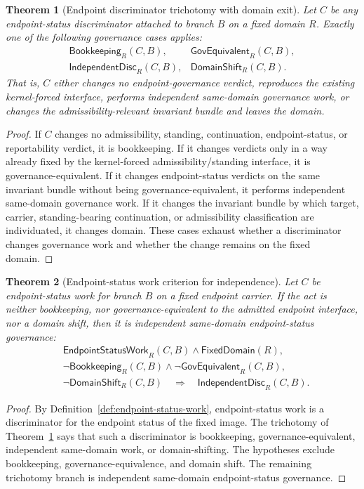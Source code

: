 \documentclass[11pt]{article}
\newtheorem{theorem}{Theorem}[section]
\theoremstyle{definition}
\theoremstyle{remark}
\newcommand{\IndDisc}{\mathsf{IndependentDisc}}
\newcommand{\GovEquiv}{\mathsf{GovEquivalent}}
\newcommand{\Bookkeep}{\mathsf{Bookkeeping}}
\newcommand{\DomShift}{\mathsf{DomainShift}}
\newcommand{\FixedDom}{\mathsf{FixedDomain}}
\newcommand{\EndpointStatusWork}{\mathsf{EndpointStatusWork}}
\begin{document}
\begin{theorem}[Endpoint discriminator trichotomy with domain exit]\label{thm:endpoint-discriminator-trichotomy}
Let \(C\) be any endpoint-status discriminator attached to branch \(B\) on a fixed domain \(R\). Exactly one of the following governance cases applies:
\[
\begin{array}{ll}
\Bookkeep_R(C,B), & \GovEquiv_R(C,B),\\[2pt]
\IndDisc_R(C,B), & \DomShift_R(C,B).
\end{array}
\]
That is, \(C\) either changes no endpoint-governance verdict, reproduces the existing kernel-forced interface, performs independent same-domain governance work, or changes the admissibility-relevant invariant bundle and leaves the domain.
\end{theorem}

\begin{proof}
If \(C\) changes no admissibility, standing, continuation, endpoint-status, or reportability verdict, it is bookkeeping. If it changes verdicts only in a way already fixed by the kernel-forced admissibility/standing interface, it is governance-equivalent. If it changes endpoint-status verdicts on the same invariant bundle without being governance-equivalent, it performs independent same-domain governance work. If it changes the invariant bundle by which target, carrier, standing-bearing continuation, or admissibility classification are individuated, it changes domain. These cases exhaust whether a discriminator changes governance work and whether the change remains on the fixed domain.
\end{proof}

\begin{theorem}[Endpoint-status work criterion for independence]\label{thm:endpoint-status-work-criterion-independence}
Let \(C\) be endpoint-status work for branch \(B\) on a fixed endpoint carrier. If the act is neither bookkeeping, nor governance-equivalent to the admitted endpoint interface, nor a domain shift, then it is independent same-domain endpoint-status governance:
\[
\begin{aligned}
  &\EndpointStatusWork_R(C,B)\wedge\FixedDom(R),\\
  &\neg\Bookkeep_R(C,B)\wedge\neg\GovEquiv_R(C,B),\\
  &\neg\DomShift_R(C,B)
  \quad\Rightarrow\quad \IndDisc_R(C,B).
\end{aligned}
\]
\end{theorem}

\begin{proof}
By Definition~\ref{def:endpoint-status-work}, endpoint-status work is a discriminator for the endpoint status of the fixed image. The trichotomy of Theorem~\ref{thm:endpoint-discriminator-trichotomy} says that such a discriminator is bookkeeping, governance-equivalent, independent same-domain work, or domain-shifting. The hypotheses exclude bookkeeping, governance-equivalence, and domain shift. The remaining trichotomy branch is independent same-domain endpoint-status governance.
\end{proof}
\end{document}

